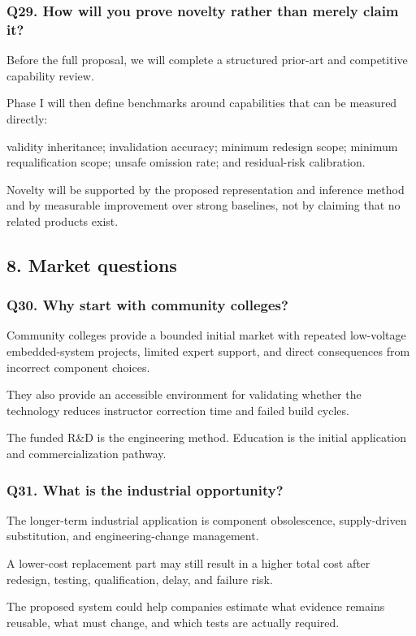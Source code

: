 \documentclass[12pt,letterpaper]{article}
\begin{document}
\subsubsection{Q29. How will you prove novelty rather than merely claim it?}

Before the full proposal, we will complete a structured prior-art and competitive capability review.

Phase I will then define benchmarks around capabilities that can be measured directly:

validity inheritance;
invalidation accuracy;
minimum redesign scope;
minimum requalification scope;
unsafe omission rate;
and residual-risk calibration.

Novelty will be supported by the proposed representation and inference method and by measurable improvement over strong baselines, not by claiming that no related products exist.

\subsection{8. Market questions}
\subsubsection{Q30. Why start with community colleges?}

Community colleges provide a bounded initial market with repeated low-voltage embedded-system projects, limited expert support, and direct consequences from incorrect component choices.

They also provide an accessible environment for validating whether the technology reduces instructor correction time and failed build cycles.

The funded R\&D is the engineering method. Education is the initial application and commercialization pathway.

\subsubsection{Q31. What is the industrial opportunity?}

The longer-term industrial application is component obsolescence, supply-driven substitution, and engineering-change management.

A lower-cost replacement part may still result in a higher total cost after redesign, testing, qualification, delay, and failure risk.

The proposed system could help companies estimate what evidence remains reusable, what must change, and which tests are actually required.
\end{document}
